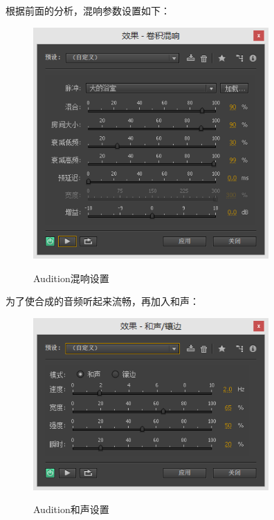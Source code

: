 \documentclass{article}
\begin{document}
            根据前面的分析，混响参数设置如下：
            \begin{figure}[htb]
                \centering
                \includegraphics[width=9cm]{figure13.png}
                \label{fig:reverb1-1}\caption{Audition混响设置}
            \end{figure}
            
            为了使合成的音频听起来流畅，再加入和声：
            \begin{figure}[H]
                \centering
                \includegraphics[width=9cm]{figure14.png}
                \label{fig:reverb1-2}\caption{Audition和声设置}
            \end{figure}
            
\end{document}
